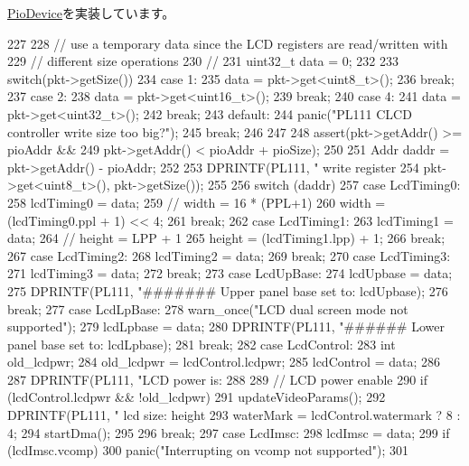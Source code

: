\hyperlink{classPioDevice_afe8371668d023bb2516b286e5e399b6f}{PioDevice}を実装しています。


\begin{DoxyCode}
227 {
228     // use a temporary data since the LCD registers are read/written with
229     // different size operations
230     //
231     uint32_t data = 0;
232 
233     switch(pkt->getSize()) {
234       case 1:
235         data = pkt->get<uint8_t>();
236         break;
237       case 2:
238         data = pkt->get<uint16_t>();
239         break;
240       case 4:
241         data = pkt->get<uint32_t>();
242         break;
243       default:
244         panic("PL111 CLCD controller write size too big?\n");
245         break;
246     }
247 
248     assert(pkt->getAddr() >= pioAddr &&
249            pkt->getAddr() < pioAddr + pioSize);
250 
251     Addr daddr = pkt->getAddr() - pioAddr;
252 
253     DPRINTF(PL111, " write register %
254             pkt->get<uint8_t>(), pkt->getSize());
255 
256     switch (daddr) {
257       case LcdTiming0:
258         lcdTiming0 = data;
259         // width = 16 * (PPL+1)
260         width = (lcdTiming0.ppl + 1) << 4;
261         break;
262       case LcdTiming1:
263         lcdTiming1 = data;
264         // height = LPP + 1
265         height = (lcdTiming1.lpp) + 1;
266         break;
267       case LcdTiming2:
268         lcdTiming2 = data;
269         break;
270       case LcdTiming3:
271         lcdTiming3 = data;
272         break;
273       case LcdUpBase:
274         lcdUpbase = data;
275         DPRINTF(PL111, "####### Upper panel base set to: %
      lcdUpbase);
276         break;
277       case LcdLpBase:
278         warn_once("LCD dual screen mode not supported\n");
279         lcdLpbase = data;
280         DPRINTF(PL111, "###### Lower panel base set to: %
      lcdLpbase);
281         break;
282       case LcdControl:
283         int old_lcdpwr;
284         old_lcdpwr = lcdControl.lcdpwr;
285         lcdControl = data;
286 
287         DPRINTF(PL111, "LCD power is:%
288 
289         // LCD power enable
290         if (lcdControl.lcdpwr && !old_lcdpwr) {
291             updateVideoParams();
292             DPRINTF(PL111, " lcd size: height %
293             waterMark = lcdControl.watermark ? 8 : 4;
294             startDma();
295         }
296         break;
297       case LcdImsc:
298         lcdImsc = data;
299         if (lcdImsc.vcomp)
300             panic("Interrupting on vcomp not supported\n");
301 
}}
\end{DoxyCode}
